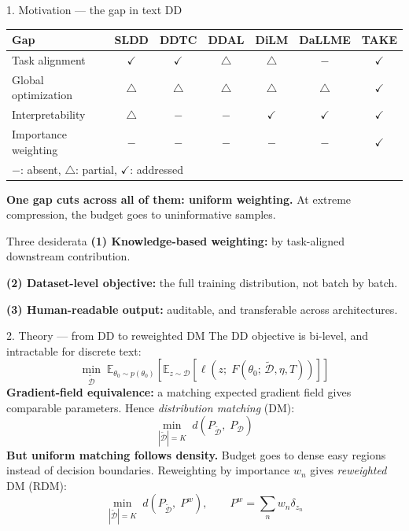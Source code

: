 \documentclass[aspectratio=169,11pt]{beamer}
\newcommand{\Dtrain}{\mathcal{D}}
\newcommand{\Ddist}{\tilde{\mathcal{D}}}
\begin{document}
\begin{frame}{1. Motivation --- the gap in text DD}
  \begin{center}
    \scriptsize
    \begin{tabular}{l c c c c c c}
      \toprule
      \textbf{Gap}         & SLDD         & DDTC         & DDAL         & DiLM         & DaLLME       & \textbf{TAKE} \\
      \midrule
      Task alignment       & $\checkmark$ & $\checkmark$ & $\triangle$  & $\triangle$  & $-$          & $\checkmark$ \\
      Global optimization  & $\triangle$  & $\triangle$  & $\triangle$  & $\triangle$  & $\triangle$  & $\checkmark$ \\
      Interpretability     & $\triangle$  & $-$          & $-$          & $\checkmark$ & $\checkmark$ & $\checkmark$ \\
      Importance weighting & $-$          & $-$          & $-$          & $-$          & $-$          & $\checkmark$ \\
      \bottomrule
      \multicolumn{7}{l}{\scriptsize $-$: absent, \quad $\triangle$: partial, \quad $\checkmark$: addressed}
    \end{tabular}
  \end{center}
  \smallskip
  \textbf{One gap cuts across all of them: uniform weighting.} At extreme compression, the budget goes to uninformative samples.
  \medskip
  \begin{block}{Three desiderata }
    \textbf{(1) Knowledge-based weighting:} by task-aligned downstream contribution.\par
    \textbf{(2) Dataset-level objective:} the full training distribution, not batch by batch.\par
    \textbf{(3) Human-readable output:} auditable, and transferable across architectures.
  \end{block}
\end{frame}

\begin{frame}{2. Theory --- from DD to reweighted DM}
  The DD objective is bi-level, and intractable for discrete text:
  \[
    \min_{\Ddist}\; \mathbb{E}_{\theta_0 \sim p(\theta_0)} \left[ \mathbb{E}_{z \sim \Dtrain} \left[ \ell\!\left(z;\; F(\theta_0;\, \Ddist, \eta, T)\right) \right] \right]
  \]
  \textbf{Gradient-field equivalence:} a matching expected gradient field gives comparable parameters. Hence \emph{distribution matching} (DM):
  \[
    \min_{|\Ddist| = K}\; d\!\left(P_{\Ddist},\; P_{\Dtrain}\right)
  \]
  \textbf{But uniform matching follows density.} Budget goes to dense easy regions instead of decision boundaries. Reweighting by importance $w_n$ gives \emph{reweighted} DM (RDM):
  \[
    \min_{|\Ddist| = K}\; d\!\left(P_{\Ddist},\; P^w\right), \qquad P^w = \textstyle\sum_n w_n \delta_{z_n}
  \]
\end{frame}
\end{document}
